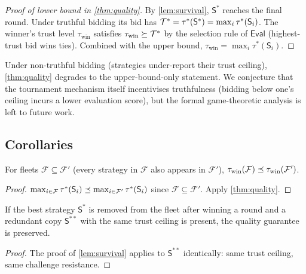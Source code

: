\documentclass[11pt]{article}
\providecommand{\Fleet}{\mathcal{F}}              %
\providecommand{\Strat}{\mathsf{S}}               %
\providecommand{\Eval}{\mathsf{Eval}}             %
\providecommand{\winner}{\mathrm{win}}            %
\providecommand{\tgeq}{\succeq}          %
\begin{document}
\begin{proof}[Proof of lower bound in \cref{thm:quality}]
By \cref{lem:survival}, $\Strat^*$ reaches the final round.  Under truthful
bidding its bid has $\trust^* = \tau^*(\Strat^*) = \max_i \tau^*(\Strat_i)$.
The winner's trust level $\tau_{\winner}$ satisfies $\tau_{\winner} \tgeq
\trust^*$ by the selection rule of $\Eval$ (highest-trust bid wins ties).
Combined with the upper bound, $\tau_{\winner} = \max_i \tau^*(\Strat_i)$.
\end{proof}

\begin{remark}\label{rem:nontruthful}
Under non-truthful bidding (strategies under-report their trust ceiling),
\cref{thm:quality} degrades to the upper-bound-only statement.  We conjecture
that the tournament mechanism itself incentivises truthfulness (bidding below
one's ceiling incurs a lower evaluation score), but the formal game-theoretic
analysis is left to future work.
\end{remark}

\subsection{Corollaries}

\begin{corollary}\label{cor:monotone}
For fleets $\Fleet \subseteq \Fleet'$ (every strategy in $\Fleet$ also
appears in $\Fleet'$),
$\tau_{\winner}(\Fleet) \tleq \tau_{\winner}(\Fleet')$.
\end{corollary}
\begin{proof}
$\max_{i \in \Fleet} \tau^*(\Strat_i) \tleq \max_{i \in \Fleet'} \tau^*
(\Strat_i)$ since $\Fleet \subseteq \Fleet'$.  Apply \cref{thm:quality}.
\end{proof}

\begin{corollary}\label{cor:redundancy}
If the best strategy $\Strat^*$ is removed from the fleet after winning
a round and a redundant copy $\Strat^{**}$ with the same trust ceiling
is present, the quality guarantee is preserved.
\end{corollary}
\begin{proof}
The proof of \cref{lem:survival} applies to $\Strat^{**}$ identically:
same trust ceiling, same challenge resistance.
\end{proof}

\end{document}
